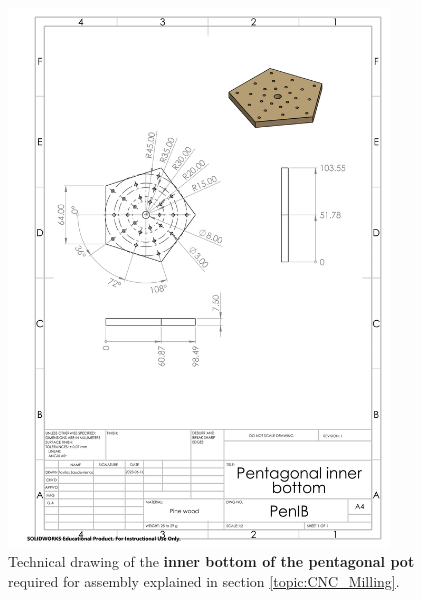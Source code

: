 \documentclass[12pt]{extarticle} %
\begin{document}
\begin{figure}[ht]
    \centering
    \includegraphics[width=0.9\textwidth]{images/technical_drawings/Pentagonal inner bottom-1.png}
    \caption{Technical drawing of the \textbf{inner bottom of the pentagonal pot} required for assembly explained in section \ref{topic:CNC_Milling}.}
    \label{technical_drawing:pent_pot_inner_bottom}
\end{figure}
\end{document}
